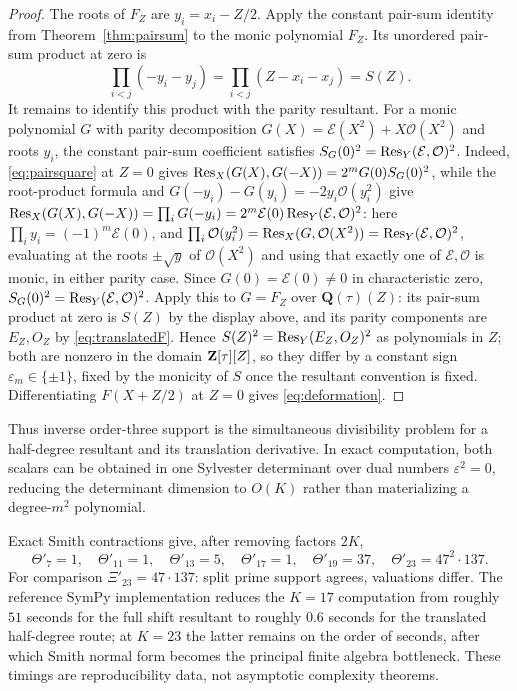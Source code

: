 \begin{proof}
The roots of $F_Z$ are $y_i=x_i-Z/2$.  Apply the constant pair-sum identity
from Theorem~\ref{thm:pairsum} to the monic polynomial $F_Z$.  Its unordered
pair-sum product at zero is
\[
\prod_{i<j}(-y_i-y_j)
 =\prod_{i<j}(Z-x_i-x_j)=S(Z).
\]
It remains to identify this product with the parity resultant.  For a
monic polynomial $G$ with parity decomposition
$G(X)=\mathcal E(X^2)+X\mathcal O(X^2)$ and roots $y_i$, the constant
pair-sum coefficient satisfies $S_G(0)^2=\operatorname{Res}_Y(\mathcal E,\mathcal O)^2$.
Indeed, \eqref{eq:pairsquare} at $Z=0$ gives
$\operatorname{Res}_X(G(X),G(-X))=2^mG(0)S_G(0)^2$, while the root-product formula and
$G(-y_i)-G(y_i)=-2y_i\mathcal O(y_i^2)$ give
$\operatorname{Res}_X(G(X),G(-X))=\prod_iG(-y_i)
=2^m\mathcal E(0)\operatorname{Res}_Y(\mathcal E,\mathcal O)^2$:
here $\prod_iy_i=(-1)^m\mathcal E(0)$, and
$\prod_i\mathcal O(y_i^2)=\operatorname{Res}_X(G,\mathcal O(X^2))
=\operatorname{Res}_Y(\mathcal E,\mathcal O)^2$, evaluating at the roots $\pm\sqrt y$ of
$\mathcal O(X^2)$ and using that exactly one of $\mathcal E,\mathcal O$
is monic, in either parity case.  Since $G(0)=\mathcal E(0)\ne0$ in
characteristic zero, $S_G(0)^2=\operatorname{Res}_Y(\mathcal E,\mathcal O)^2$.  Apply
this to $G=F_Z$ over $\mathbf Q(\tau)(Z)$: its pair-sum product at zero
is $S(Z)$ by the display above, and its parity components are $E_Z,O_Z$
by \eqref{eq:translatedF}.  Hence
$S(Z)^2=\operatorname{Res}_Y(E_Z,O_Z)^2$ as polynomials in $Z$; both are nonzero in
the domain $\mathbf Z[\tau][Z]$, so they differ by a constant sign
$\varepsilon_m\in\{\pm1\}$, fixed by the monicity of $S$ once the
resultant convention is fixed.  Differentiating
$F(X+Z/2)$ at $Z=0$ gives \eqref{eq:deformation}.
\end{proof}

Thus inverse order-three support is the simultaneous divisibility problem for a
half-degree resultant and its translation derivative.  In exact computation,
both scalars can be obtained in one Sylvester determinant over dual numbers
$\varepsilon^2=0$, reducing the determinant dimension to $O(K)$ rather than
materializing a degree-$m^2$ polynomial.

Exact Smith contractions give, after removing factors $2K$,
\[
\Theta'_7=1,\quad
\Theta'_{11}=1,\quad
\Theta'_{13}=5,\quad
\Theta'_{17}=1,\quad
\Theta'_{19}=37,\quad
\Theta'_{23}=47^2\cdot137.
\]
For comparison $\Xi'_{23}=47\cdot137$: split prime support agrees, valuations
differ.  The reference SymPy implementation reduces the $K=17$ computation
from roughly $51$ seconds for the full shift resultant to roughly $0.6$ seconds
for the translated half-degree route; at $K=23$ the latter remains on the
order of seconds, after which Smith normal form becomes the principal finite
algebra bottleneck.  These timings are reproducibility data, not asymptotic
complexity theorems.

